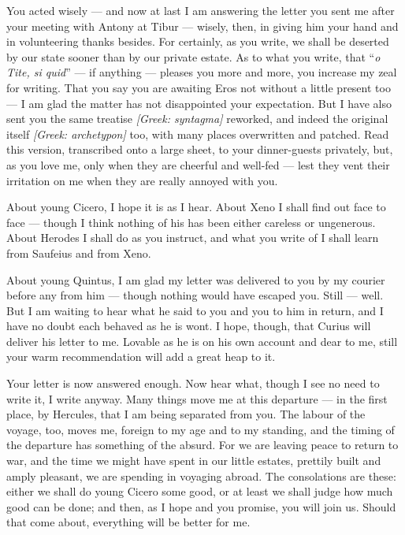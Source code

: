 

 You acted wisely --- and now at last I am answering the letter you sent me after your meeting with Antony at Tibur --- wisely, then, in giving him your hand and in volunteering thanks besides. For certainly, as you write, we shall be deserted by our state sooner than by our private estate. As to what you write, that ``\textit{o Tite, si quid}'' --- if anything --- pleases you more and more, you increase my zeal for writing. That you say you are awaiting Eros not without a little present too --- I am glad the matter has not disappointed your expectation. But I have also sent you the same treatise \textit{[Greek: syntagma]} reworked, and indeed the original itself \textit{[Greek: archetypon]} too, with many places overwritten and patched. Read this version, transcribed onto a large sheet, to your dinner-guests privately, but, as you love me, only when they are cheerful and well-fed --- lest they vent their irritation on me when they are really annoyed with you.

 About young Cicero, I hope it is as I hear. About Xeno I shall find out face to face --- though I think nothing of his has been either careless or ungenerous. About Herodes I shall do as you instruct, and what you write of I shall learn from Saufeius and from Xeno.

 About young Quintus, I am glad my letter was delivered to you by my courier before any from him --- though nothing would have escaped you. Still --- well. But I am waiting to hear what he said to you and you to him in return, and I have no doubt each behaved as he is wont. I hope, though, that Curius will deliver his letter to me. Lovable as he is on his own account and dear to me, still your warm recommendation will add a great heap to it.

 Your letter is now answered enough. Now hear what, though I see no need to write it, I write anyway. Many things move me at this departure --- in the first place, by Hercules, that I am being separated from you. The labour of the voyage, too, moves me, foreign to my age and to my standing, and the timing of the departure has something of the absurd. For we are leaving peace to return to war, and the time we might have spent in our little estates, prettily built and amply pleasant, we are spending in voyaging abroad. The consolations are these: either we shall do young Cicero some good, or at least we shall judge how much good can be done; and then, as I hope and you promise, you will join us. Should that come about, everything will be better for me.

